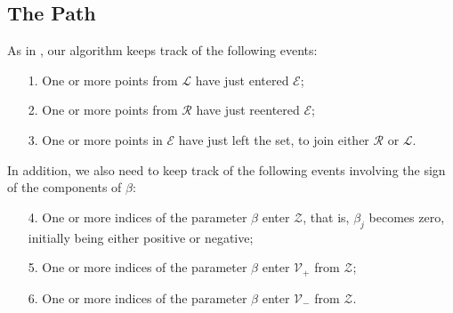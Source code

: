 \documentclass[10pt]{article}
\theoremstyle{definition}
\begin{document}

\subsection{The Path}
As in \cite{hastie2004entire}, our algorithm keeps track of the following events:
\begin{enumerate}
\item[1.] One or more points from $\mathcal L$ have just entered $\mathcal E$;
\item[2.] One or more points from $\mathcal R$ have just reentered $\mathcal E$;
\item[3.] One or more points in $\mathcal E$ have just left the set, to join either $\mathcal R$ or $\mathcal L$.
\end{enumerate}
\noindent In addition, we also need to keep track of the following events involving the sign of the components of $\beta$:
\begin{enumerate}
\item[4.] One or more indices of the parameter $\beta$ enter $\mathcal Z$, that is,  $\beta_j$ becomes zero, initially being either positive or negative;
\item[5.] One or more indices of the parameter $\beta$ enter $\mathcal V_+$ from $\mathcal Z$;
\item[6.]  One or more indices of the parameter $\beta$ enter $\mathcal V_-$ from $\mathcal Z$.
\end{enumerate}
\end{document}
